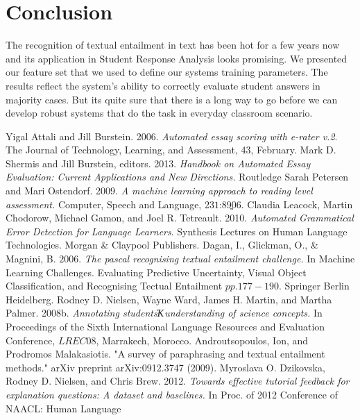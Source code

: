 \documentclass[a4paper]{article}
\begin{document}
\section{Conclusion}
The recognition of textual entailment in text has been hot for a few years now and its application in Student Response Analysis looks promising. We presented our feature set that we used to define our systems training parameters. The results reflect the system's ability to correctly evaluate student answers in majority cases. But its quite sure that there is a long way to go before we can develop robust systems that do the task in everyday classroom scenario.





\eightpt

\begin{thebibliography}{10}
Yigal Attali and Jill Burstein. 2006.\textit{ Automated essay
scoring with e-rater v.2}. The Journal of Technology,
Learning, and Assessment, 4\(3\), February.
Mark D. Shermis and Jill Burstein, editors. 2013. \textit{Handbook
on Automated Essay Evaluation: Current Applications
and New Directions.} Routledge
Sarah Petersen and Mari Ostendorf. 2009. \textit{A machine
learning approach to reading level assessment.} Computer,
Speech and Language, 23\(1\):89ֱ06.
Claudia Leacock, Martin Chodorow, Michael Gamon,
and Joel R. Tetreault. 2010. \textit{Automated Grammatical
Error Detection for Language Learners}. Synthesis
Lectures on Human Language Technologies. Morgan
\& Claypool Publishers.
Dagan, I., Glickman, O., \& Magnini, B. \(2006\). \textit{The pascal recognising textual entailment challenge.} In Machine Learning Challenges. Evaluating Predictive Uncertainty, Visual Object Classification, and Recognising Tectual Entailment \(pp. 177-190\). Springer Berlin Heidelberg.
Rodney D. Nielsen, Wayne Ward, James H. Martin, and
Martha Palmer. 2008b.\textit{ Annotating studentsҠunderstanding
of science concepts.} In Proceedings of the
Sixth International Language Resources and Evaluation
Conference, \(LREC08\), Marrakech, Morocco. 
Androutsopoulos, Ion, and Prodromos Malakasiotis. "A survey of paraphrasing and textual entailment methods." arXiv preprint arXiv:0912.3747 (2009).
Myroslava O. Dzikovska, Rodney D. Nielsen, and Chris
Brew. 2012. \textit{Towards effective tutorial feedback for
explanation questions: A dataset and baselines.} In
Proc. of 2012 Conference of NAACL: Human Language

\end{thebibliography}
\end{document}

